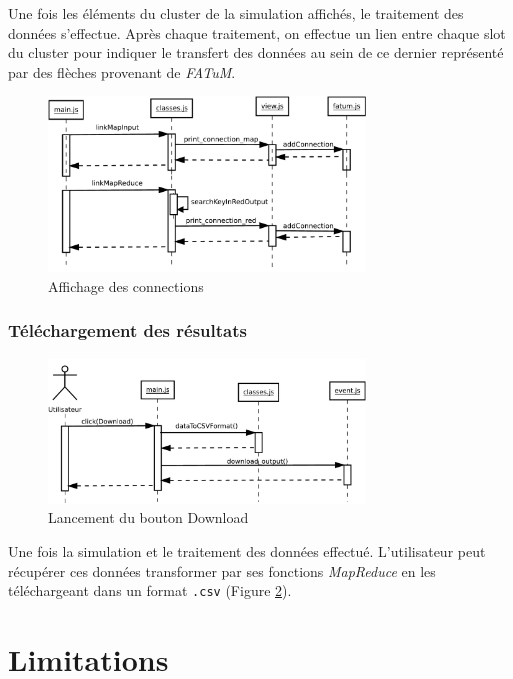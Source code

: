 Une fois les éléments du cluster de la simulation affichés, le traitement des données s'effectue. Après chaque traitement, on effectue un lien entre chaque slot du cluster pour indiquer le transfert des données au sein de ce dernier représenté par des flèches provenant de {\it FATuM}.

\begin{figure}[H]
  \centering
    \includegraphics[width=0.75\textwidth]{diagram/print_connection.pdf}
        \caption{Affichage des connections}
        \label{fig:connection}
\end{figure}

\subsubsection{Téléchargement des résultats}
\begin{figure}[H]
  \centering
    \includegraphics[width=0.75\textwidth]{diagram/download.pdf}
        \caption{Lancement du bouton Download}
        \label{fig:DL}
\end{figure}

Une fois la simulation et le traitement des données effectué. L'utilisateur peut récupérer ces données transformer par ses fonctions {\it MapReduce} en les téléchargeant dans un format {\tt .csv} (Figure \ref{fig:DL}).




\section{Limitations}

